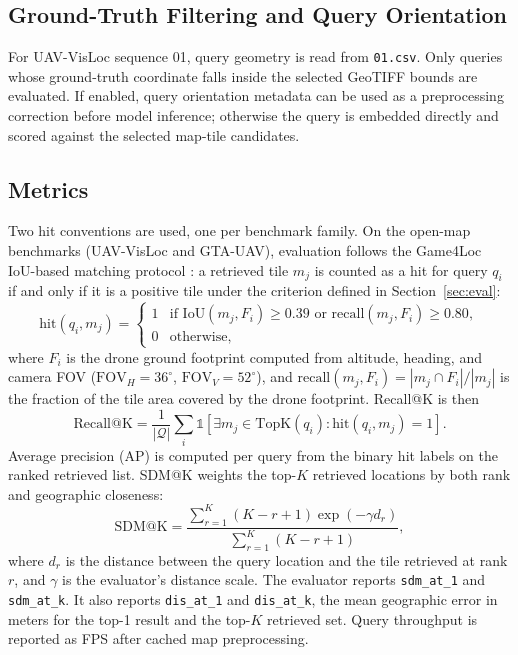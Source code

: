 \documentclass[conference]{IEEEtran}
\begin{document}
\subsection{Ground-Truth Filtering and Query Orientation}
For UAV-VisLoc sequence 01, query geometry is read from \texttt{01.csv}.
Only queries whose ground-truth coordinate falls inside the selected GeoTIFF
bounds are evaluated. If enabled, query orientation metadata can be used as a
preprocessing correction before model inference; otherwise the query is
embedded directly and scored against the selected map-tile candidates.

\subsection{Metrics}
Two hit conventions are used, one per benchmark family. On the open-map
benchmarks (UAV-VisLoc and GTA-UAV), evaluation follows the Game4Loc
IoU-based matching protocol \cite{ji2024game4loc}: a retrieved tile $m_j$
is counted as a hit for query $q_i$ if and only if it is a positive tile
under the criterion defined in Section~\ref{sec:eval}:
\begin{equation}
  \mathrm{hit}(q_i, m_j) =
  \begin{cases}
    1 & \text{if } \mathrm{IoU}(m_j, F_i) \geq 0.39
        \text{ or } \mathrm{recall}(m_j, F_i) \geq 0.80, \\
    0 & \text{otherwise,}
  \end{cases}
\end{equation}
where $F_i$ is the drone ground footprint computed from altitude, heading,
and camera FOV ($\mathrm{FOV}_H=36^\circ$, $\mathrm{FOV}_V=52^\circ$), and
$\mathrm{recall}(m_j, F_i) = |m_j \cap F_i| / |m_j|$ is the fraction of
the tile area covered by the drone footprint.
Recall@K is then
\begin{equation}
\mathrm{Recall@K} =
\frac{1}{|\mathcal{Q}|}\sum_i
\mathbb{1}\!\left[
\exists m_j\in \mathrm{TopK}(q_i):
\mathrm{hit}(q_i, m_j) = 1
\right].
\end{equation}
Average precision (AP) is computed per query from the binary hit labels
on the ranked retrieved list.
SDM@K weights the top-$K$ retrieved locations by both rank and
geographic closeness:
\begin{equation}
\mathrm{SDM@K} =
\frac{\sum_{r=1}^{K}(K-r+1)\exp(-\gamma d_r)}
{\sum_{r=1}^{K}(K-r+1)},
\end{equation}
where $d_r$ is the distance between the query location and the tile retrieved
at rank $r$, and $\gamma$ is the evaluator's distance scale. The evaluator
reports \texttt{sdm\_at\_1} and \texttt{sdm\_at\_k}. It also reports
\texttt{dis\_at\_1} and \texttt{dis\_at\_k}, the mean geographic error in
meters for the top-1 result and the top-$K$ retrieved set. Query throughput is
reported as FPS after cached map preprocessing.
\end{document}
